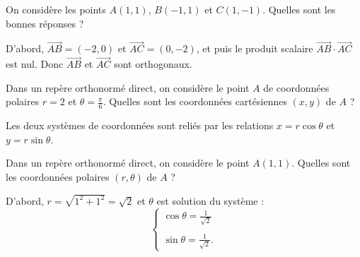 \begin{question}
On considère les points $A(1,1)$, $B(-1,1)$ et $C(1,-1)$. Quelles sont les bonnes réponses ?
\begin{answers}  
\end{answers}
\begin{explanations}
D'abord, $\overrightarrow{AB}=(-2,0)$ et $\overrightarrow{AC}=(0,-2)$, et puis le produit scalaire $\overrightarrow{AB}\cdot\overrightarrow{AC}$ est nul. Donc $\overrightarrow{AB}$ et $\overrightarrow{AC}$ sont orthogonaux.
\end{explanations}
\end{question}


\begin{question}
Dans un repère orthonormé direct, on considère le point $A$ de coordonnées polaires $r=2$ et $\displaystyle \theta =\frac{\pi}{6}$. Quelles sont les coordonnées cartésiennes $(x,y)$ de $A$ ?
\begin{answers}  
\end{answers}
\begin{explanations}
Les deux systèmes de coordonnées sont reliés par les relations $x=r\cos \theta$ et $y=r\sin \theta $.
\end{explanations}
\end{question}


\begin{question}
Dans un repère orthonormé direct, on considère le point $A(1,1)$. Quelles sont les coordonnées polaires $(r,\theta)$ de $A$ ?
\begin{answers}  
\end{answers}
\begin{explanations}
D'abord, $r=\sqrt{1^2+1^2}=\sqrt{2}$ et $\theta $ est solution du système : 
$$\left\{\begin{array}{l}\displaystyle \cos \theta =\frac{1}{\sqrt{2}}\\ \\ \displaystyle \sin \theta =\frac{1}{\sqrt{2}}.\end{array}\right.$$
\end{explanations}
\end{question}


